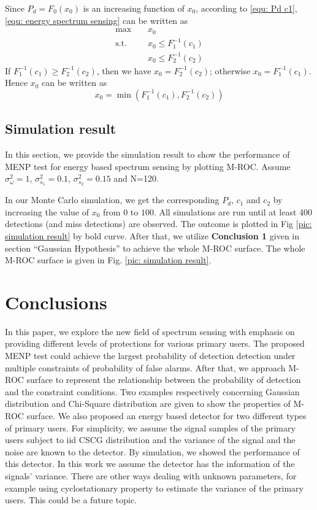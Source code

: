 \documentclass[12pt,journal,a4paper,twoside,doublecolumn]{IEEEtran}
\begin{document}
\begin{spacing}{1.0}
Since $P_d = F_0(x_0)$ is an increasing function of $x_0$,  according to \eqref{equ: Pd c1}, \eqref{equ: energy spectrum sensing} can be written as  
\begin{equation}
\begin{split}
\max\;\;\;\;&x_0\\
\text{s.t.}\;\;\;\;&x_0 \leq F_1^{-1}(c_1)\\
  &x_0 \leq F_2^{-1}(c_2)
\end{split}
\end{equation}
If $F_1^{-1}(c_1) \geq F_2^{-1}(c_2)$, then we have $x_0 = F_2^{-1}(c_2)$; otherwise $x_0 = F_1^{-1}(c_1)$. Hence $x_0$ can be written as
\begin{equation}
x_0 = \min(F_1^{-1}(c_1), F_2^{-1}(c_2))
\end{equation}

\subsection{Simulation result}
In this section, we provide the simulation result to show the performance of MENP test for energy based spectrum sensing by plotting M-ROC.  
Assume $\sigma_\omega^2 = 1$, $\sigma_{s_1}^2 = 0.1$, $\sigma_{s_2}^2  = 0.15$ and N=120.

In our Monte Carlo simulation, we get the corresponding $P_d$, $c_1$ and $c_2$ by increasing the value of $x_0$ from $0$ to $100$. All simulations are run until at least 400 detections (and miss detections) are observed. 
The outcome is plotted in Fig \ref{pic: simulation result} by bold curve. 
After that, we utilize \textbf{Conclusion 1} given in section ``Gaussian Hypothesis'' to achieve the whole M-ROC surface. 
The whole M-ROC surface is given in Fig. \ref{pic: simulation result}.

\section{Conclusions}
In this paper, we explore the new field of spectrum sensing with emphasis on providing different levels of protections for various primary users. 
The proposed MENP test could achieve the largest probability of detection detection under multiple constraints of probability of false alarms. 
After that, we approach M-ROC surface to represent the relationship between the probability of detection and the constraint conditions. Two examples respectively concerning Gaussian distribution and Chi-Square distribution are given to show the properties of M-ROC surface. 
We also proposed an energy based detector for two different types of primary users.
For simplicity, we assume the signal samples of the primary users subject to iid CSCG distribution and the variance of the signal and the noise are known to the detector.
By simulation, we showed the performance of this detector. 
In this work we assume the detector has the information of the signals' variance. There are other ways dealing with unknown parameters, for example using cyclostationary property to estimate the variance of the primary users. This could be a future topic.  


\end{spacing}
\end{document}
